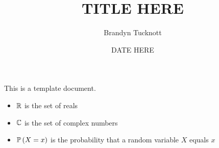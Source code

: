 \documentclass{exam}
\title{TITLE HERE}
\author{Brandyn Tucknott}
\date{DATE HERE}
\begin{document}
\maketitle

This is a template document.
\begin{itemize}
    \item $\mathbb {R}$ is the set of reals
    \item $\mathbb{C}$ is the set of complex numbers
    \item $\mathbb{P}\left( X = x \right)$ is the probability that a random variable $X$ equals $x$
\end{itemize}
\end{document}
